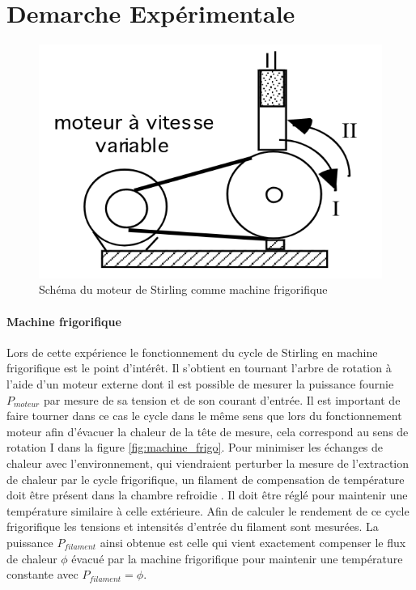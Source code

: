 \section{Demarche Expérimentale}






\begin{minipage}{\linewidth}
    \begin{figure}
        \includegraphics[width=\linewidth]{figures/machine-frigo.png}
        \caption{Schéma du moteur de Stirling comme machine frigorifique \cite{notice}}
        \label{fig:machine_frigo}
    \end{figure}

    \paragraph*{Machine frigorifique}
    Lors de cette expérience le fonctionnement du cycle de Stirling en machine frigorifique est le point d'intérêt. Il s'obtient en tournant l'arbre de rotation à l'aide d'un moteur externe dont il est possible de mesurer la puissance fournie \(P_{moteur}\) par mesure de sa tension et de son courant d'entrée. Il est important de faire tourner dans ce cas le cycle dans le même sens que lors du fonctionnement moteur afin d'évacuer la chaleur de la tête de mesure, cela correspond au sens de rotation I dans la figure \autoref{fig:machine_frigo}. Pour minimiser les échanges de chaleur avec l'environnement, qui viendraient perturber la mesure de l'extraction de chaleur par le cycle frigorifique, un filament de compensation de température doit être présent dans la chambre refroidie \cite{notice}. Il doit être réglé pour maintenir une température similaire à celle extérieure. Afin de calculer le rendement de ce cycle frigorifique les tensions et intensités d'entrée du filament sont mesurées. La puissance \(P_{filament}\) ainsi obtenue est celle qui vient exactement compenser le flux de chaleur \(\phi\) évacué par la machine frigorifique pour maintenir une température constante avec \(P_{filament} = \phi\).
\end{minipage}

